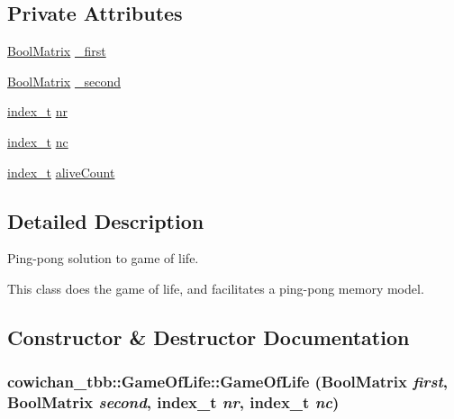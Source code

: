 \subsection*{Private Attributes}
\begin{CompactItemize}
\item 
\hyperlink{cowichan_8hpp_a64c8df2f1e9c8ea68a7bcc19aca683e}{BoolMatrix} \hyperlink{classcowichan__tbb_1_1_game_of_life_2a78cdb68396003c0963ac3ef5526370}{\_\-first}
\item 
\hyperlink{cowichan_8hpp_a64c8df2f1e9c8ea68a7bcc19aca683e}{BoolMatrix} \hyperlink{classcowichan__tbb_1_1_game_of_life_4b7e727ef2859168cafc1fa144e5255e}{\_\-second}
\item 
\hyperlink{cowichan_8hpp_5b04577d5d21124855deaad298595371}{index\_\-t} \hyperlink{classcowichan__tbb_1_1_game_of_life_570da56c471fa8c5f2c83e572775f75e}{nr}
\item 
\hyperlink{cowichan_8hpp_5b04577d5d21124855deaad298595371}{index\_\-t} \hyperlink{classcowichan__tbb_1_1_game_of_life_e7584561d427c5f4922853deda9b402f}{nc}
\item 
\hyperlink{cowichan_8hpp_5b04577d5d21124855deaad298595371}{index\_\-t} \hyperlink{classcowichan__tbb_1_1_game_of_life_ad536d79679edcb0c5946bb9b0464e4a}{aliveCount}
\end{CompactItemize}


\subsection{Detailed Description}
Ping-pong solution to game of life. 

This class does the game of life, and facilitates a ping-pong memory model. 

\subsection{Constructor \& Destructor Documentation}
\hypertarget{classcowichan__tbb_1_1_game_of_life_4793e3b09cc0c43cdb3d5bff8c002a3f}{
\subsubsection[{GameOfLife}]{\setlength{\rightskip}{0pt plus 5cm}cowichan\_\-tbb::GameOfLife::GameOfLife ({\bf BoolMatrix} {\em first}, \/  {\bf BoolMatrix} {\em second}, \/  {\bf index\_\-t} {\em nr}, \/  {\bf index\_\-t} {\em nc})}}
\label{classcowichan__tbb_1_1_game_of_life_4793e3b09cc0c43cdb3d5bff8c002a3f}


